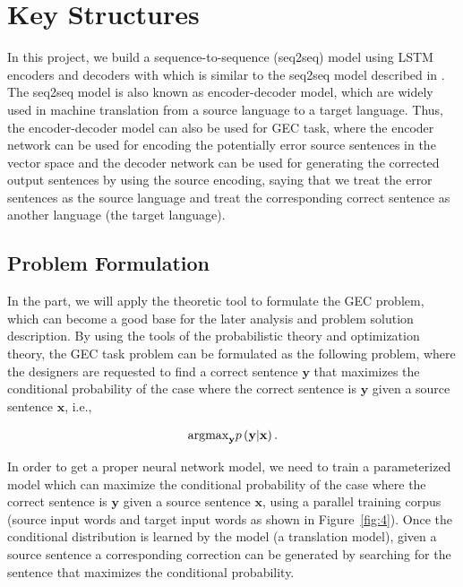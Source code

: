 \chapter{Key Structures}
\label{chapter3}

In this project, we build a sequence-to-sequence (seq2seq) model using LSTM encoders and decoders with which is similar to the seq2seq model described in \cite{bahdanau2014neural}. The seq2seq model is also known as encoder-decoder model, which are widely used in machine translation from a source language to a target language. Thus, the encoder-decoder model can also be used for GEC task, where the encoder network can be used for encoding the potentially error source sentences in the vector space and the decoder network can be used for generating the corrected output sentences by using the source encoding, saying that we treat the error  sentences as the source language and treat the corresponding correct sentence as another language (the target language).

\section{Problem Formulation}
In the part, we will apply the theoretic tool to formulate the GEC problem, which can become a good base for the later analysis and problem solution description. By using the tools of the probabilistic theory and optimization theory, the GEC task problem can be formulated as the following problem, where the designers are requested to find a correct sentence $\mathbf{y}$ that maximizes the conditional probability of the case where the correct sentence is $\mathbf{y}$ given a source sentence $\mathbf{x}$, i.e.,

$${\rm argmax}_\mathbf{y}p\left(\mathbf{y}| \mathbf{x}\right).$$

In order to get a proper neural network model, we need to train a parameterized model which can maximize the conditional probability of the case where the correct sentence is $\mathbf{y}$ given a source sentence $\mathbf{x}$, using a parallel training corpus (source input words and target input words as shown in Figure~\ref{fig:4}). Once the conditional distribution is learned by the model (a translation model), given a source sentence a corresponding correction can be generated by searching for the sentence that maximizes the conditional probability.

